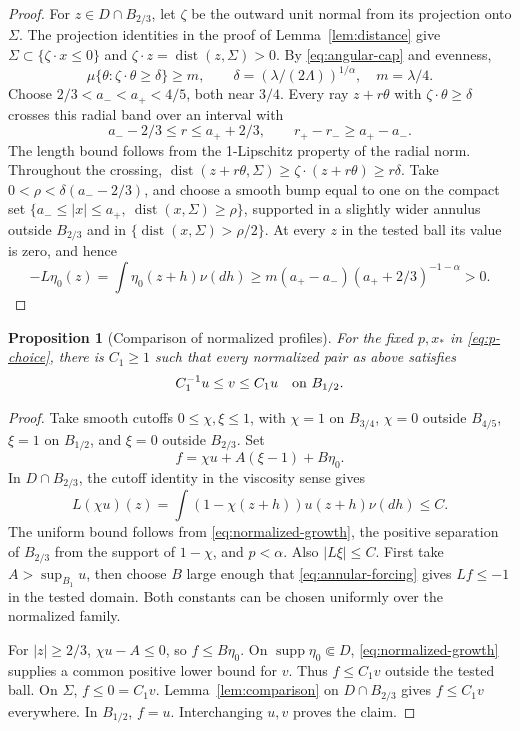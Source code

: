 \documentclass[11pt]{article}
\newtheorem{proposition}[theorem]{Proposition}
\numberwithin{equation}{section}
\newcommand{\dist}{\operatorname{dist}}
\newcommand{\supp}{\operatorname{supp}}
\begin{document}
\begin{proof}
For \(z\in D\cap B_{2/3}\), let \(\zeta\) be the outward unit normal
from its projection onto \(\Sigma\). The projection identities in the
proof of Lemma~\ref{lem:distance} give
\(\Sigma\subset\{\zeta\cdot x\le0\}\) and
\(\zeta\cdot z=\dist(z,\Sigma)>0\).
By \eqref{eq:angular-cap} and evenness,
\[
 \mu\{\theta:\zeta\cdot\theta\ge\delta\}\ge m,
 \qquad \delta=(\lambda/(2\Lambda))^{1/\alpha},\quad m=\lambda/4.
\]
Choose \(2/3<a_-<a_+<4/5\), both near \(3/4\). Every ray
\(z+r\theta\) with \(\zeta\cdot\theta\ge\delta\) crosses this radial
band over an interval with
\[
 a_--2/3\le r\le a_++2/3,\qquad r_+-r_-\ge a_+-a_-.
\]
The length bound follows from the 1-Lipschitz property of the radial norm.
Throughout the crossing,
\(\dist(z+r\theta,\Sigma)\ge\zeta\cdot(z+r\theta)\ge r\delta\).
Take \(0<\rho<\delta(a_--2/3)\), and choose a smooth bump equal to one
on the compact set
\(\{a_-\le|x|\le a_+,\ \dist(x,\Sigma)\ge\rho\}\),
supported in a slightly wider annulus outside \(B_{2/3}\) and in
\(\{\dist(x,\Sigma)>\rho/2\}\).
At every \(z\) in the tested ball its value is zero, and hence
\[
 -L\eta_0(z)=\int\eta_0(z+h)\nu(dh)
 \ge m(a_+-a_-)(a_++2/3)^{-1-\alpha}>0.
\]
\end{proof}

\begin{proposition}[Comparison of normalized profiles]\label{prop:local}
For the fixed \(p,x_*\) in \eqref{eq:p-choice}, there is \(C_1\ge1\)
such that every normalized pair as above satisfies
\begin{equation}\label{eq:local-comparison}
 C_1^{-1}u\le v\le C_1u\quad\hbox{on }B_{1/2}.
\end{equation}
\end{proposition}

\begin{proof}
Take smooth cutoffs \(0\le\chi,\xi\le1\), with \(\chi=1\) on
\(B_{3/4}\), \(\chi=0\) outside \(B_{4/5}\), \(\xi=1\) on
\(B_{1/2}\), and \(\xi=0\) outside \(B_{2/3}\). Set
\[
 f=\chi u+A(\xi-1)+B\eta_0.
\]
In \(D\cap B_{2/3}\), the cutoff identity in the viscosity sense gives
\[
 L(\chi u)(z)=\int(1-\chi(z+h))u(z+h)\nu(dh)\le C.
\]
The uniform bound follows from \eqref{eq:normalized-growth}, the positive
separation of \(B_{2/3}\) from the support of \(1-\chi\), and
\(p<\alpha\). Also \(|L\xi|\le C\).
First take \(A>\sup_{B_1}u\), then choose \(B\) large enough that
\eqref{eq:annular-forcing} gives \(Lf\le-1\) in the tested domain.
Both constants can be chosen uniformly over the normalized family.

For \(|z|\ge2/3\), \(\chi u-A\le0\), so \(f\le B\eta_0\).
On \(\supp\eta_0\Subset D\), \eqref{eq:normalized-growth} supplies a
common positive lower bound for \(v\). Thus \(f\le C_1v\) outside the
tested ball. On \(\Sigma\), \(f\le0=C_1v\).
Lemma~\ref{lem:comparison} on \(D\cap B_{2/3}\) gives \(f\le C_1v\)
everywhere. In \(B_{1/2}\), \(f=u\). Interchanging \(u,v\) proves the claim.
\end{proof}
\end{document}
